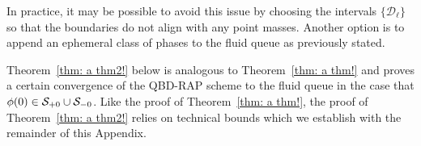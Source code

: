 \begin{rem}
In practice, it may be possible to avoid this issue by choosing the intervals \(\{\mathcal D_\ell\}\) so that the boundaries do not align with any point masses. Another option is to append an ephemeral class of phases to the fluid queue as previously stated. 

\end{rem}

Theorem~\ref{thm: a thm2!} below is analogous to Theorem~\ref{thm: a thm!} and proves a certain convergence of the QBD-RAP scheme to the fluid queue in the case that \(\phi(0)\in\mathcal S_{+0}\cup\mathcal{S}_{-0}\). Like the proof of Theorem~\ref{thm: a thm!}, the proof of Theorem~\ref{thm: a thm2!} relies on technical bounds which we establish with the remainder of this Appendix. 


